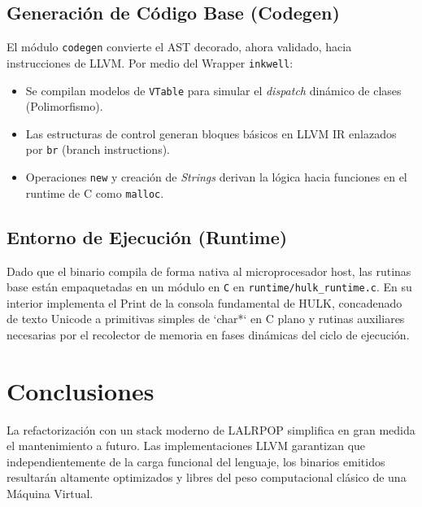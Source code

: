 \documentclass[11pt,a4paper]{article}
\begin{document}
\subsection{Generación de Código Base (Codegen)}
El módulo \texttt{codegen} convierte el AST decorado, ahora validado, hacia instrucciones de LLVM. Por medio del Wrapper \texttt{inkwell}:
\begin{itemize}
    \item Se compilan modelos de \texttt{VTable} para simular el \textit{dispatch} dinámico de clases (Polimorfismo).
    \item Las estructuras de control generan bloques básicos en LLVM IR enlazados por \texttt{br} (branch instructions). 
    \item Operaciones \texttt{new} y creación de \textit{Strings} derivan la lógica hacia funciones en el runtime de C como \texttt{malloc}.
\end{itemize}

\subsection{Entorno de Ejecución (Runtime)}
Dado que el binario compila de forma nativa al microprocesador host, las rutinas base están empaquetadas en un módulo en \texttt{C} en \texttt{runtime/hulk\_runtime.c}. En su interior implementa el Print de la consola fundamental de HULK, concadenado de texto Unicode a primitivas simples de `char*` en C plano y rutinas auxiliares necesarias por el recolector de memoria en fases dinámicas del ciclo de ejecución. 

\section{Conclusiones}
La refactorización con un stack moderno de LALRPOP simplifica en gran medida el mantenimiento a futuro. Las implementaciones LLVM garantizan que independientemente de la carga funcional del lenguaje, los binarios emitidos resultarán altamente optimizados y libres del peso computacional clásico de una Máquina Virtual.
\end{document}
